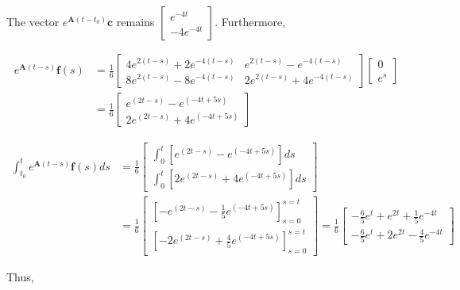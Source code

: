 \documentclass[10pt]{article}
\begin{document}
The vector $e^{\mathbf{A}\left(t-t_{0}\right)} \mathbf{c}$ remains $\left[\begin{array}{c}e^{-4 t} \\ -4 e^{-4 t}\end{array}\right]$. Furthermore,

$$
\begin{aligned}
e^{\mathbf{A}(t-s)} \mathbf{f}(s) & =\frac{1}{6}\left[\begin{array}{cc}
4 e^{2(t-s)}+2 e^{-4(t-s)} & e^{2(t-s)}-e^{-4(t-s)} \\
8 e^{2(t-s)}-8 e^{-4(t-s)} & 2 e^{2(t-s)}+4 e^{-4(t-s)}
\end{array}\right]\left[\begin{array}{l}
0 \\
e^{s}
\end{array}\right] \\
& =\frac{1}{6}\left[\begin{array}{c}
e^{(2 t-s)}-e^{(-4 t+5 s)} \\
2 e^{(2 t-s)}+4 e^{(-4 t+5 s)}
\end{array}\right]
\end{aligned}
$$

$$
\begin{aligned}
\int_{t_{0}}^{t} e^{\mathbf{A}(t-s)} \mathbf{f}(s) d s & =\frac{1}{6}\left[\begin{array}{c}
\int_{0}^{t}\left[e^{(2 t-s)}-e^{(-4 t+5 s)}\right] d s \\
\int_{0}^{t}\left[2 e^{(2 t-s)}+4 e^{(-4 t+5 s)}\right] d s
\end{array}\right] \\
& =\frac{1}{6}\left[\begin{array}{l}
{\left[-e^{(2 t-s)}-\frac{1}{5} e^{(-4 t+5 s)}\right]_{s=0}^{s=t}} \\
{\left[-2 e^{(2 t-s)}+\frac{4}{5} e^{(-4 t+5 s)}\right]_{s=0}^{s=t}}
\end{array}\right]=\frac{1}{6}\left[\begin{array}{l}
-\frac{6}{5} e^{t}+e^{2 t}+\frac{1}{5} e^{-4 t} \\
-\frac{6}{5} e^{t}+2 e^{2 t}-\frac{4}{5} e^{-4 t}
\end{array}\right]
\end{aligned}
$$

Thus,
\end{document}
